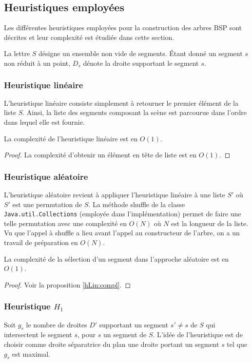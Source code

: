 \subsection{Heuristiques employées}\label{heur:section}
Les différentes heuristiques employées pour la construction des arbres
BSP sont décrites et leur complexité est étudiée dans cette section.

La lettre $S$ désigne un ensemble non vide de segments. \'Etant donné
un segment $s$ non réduit à un point, $D_s$ dénote la droite
supportant le segment $s$.
\subsubsection*{Heuristique linéaire}
L'heuristique linéaire consiste simplement à retourner le premier
élément de la liste $S$. Ainsi, la liste des segments composant
la scène est parcourue dans l'ordre dans lequel elle est fournie.

\begin{prop}\label{hLin:compl}
 La complexité de l'heuristique linéaire est en $O(1)$.
\end{prop}
\begin{proof}
  La complexité d'obtenir un élément en tête de liste
  est en $O(1)$.
\end{proof}

\subsubsection*{Heuristique aléatoire}

L'heuristique aléatoire revient à appliquer l'heuristique linéaire
à une liste $S'$ où $S'$ est une permutation de $S$. La méthode
shuffle de la classe \texttt{Java.util.Collections}
(employée dans l'implémentation) permet de faire
une telle permutation avec une complexité en $O(N)$
où $N$ est la longueur de la liste.
Vu que l'appel à shuffle a lieu avant l'appel au constructeur de l'arbre,
on a un travail de préparation en $O(N)$.

\begin{prop}
  La complexité de la sélection d'un segment dans
  l'approche aléatoire est en $O(1)$.
\end{prop}
\begin{proof}
  Voir la proposition \ref{hLin:compl}.
\end{proof}


\subsubsection*{Heuristique $H_1$}
Soit $g_s$ le nombre de droites $D'$ supportant un segment $s' \neq s$
de $S$ qui intersectent le segment $s$, pour $s$ un segment de $S$.
L'idée de l'heuristique est de choisir comme droite séparatrice du plan
une droite portant un segment $s$ tel que $g_s$ est maximal.

